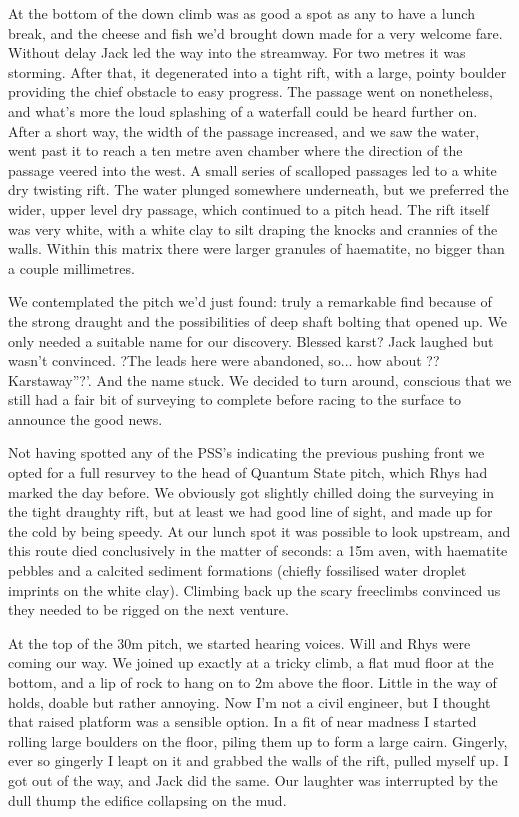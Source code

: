 \documentclass[onecolumn]{book}
\begin{document}
At the bottom of the down climb was as good a spot as any to have a lunch break, and the cheese and fish we'd brought down made for a very welcome fare. Without delay Jack led the way into the streamway. For two metres it was storming. After that, it degenerated into a tight rift, with a large, pointy boulder providing the chief obstacle to easy progress. The passage went on nonetheless, and what's more the loud splashing of a waterfall could be heard further on. After a short way, the width of the passage increased, and we saw the water, went past it to reach a ten metre aven chamber where the direction of the passage veered into the west. A small series of scalloped passages led to a white dry twisting rift. The water plunged somewhere underneath, but we preferred the wider, upper level dry passage, which continued to a pitch head. The rift itself was very white, with a white clay to silt draping the knocks and crannies of the walls. Within this matrix there were larger granules of haematite, no bigger than a couple millimetres. 

We contemplated the pitch we'd just found: truly a remarkable find because of the strong draught and the possibilities of deep shaft bolting that opened up. We only needed a suitable name for our discovery. Blessed karst? Jack laughed but wasn't convinced. ?The leads here were abandoned, so... how about ??Karstaway''?'. And the name stuck. We decided to turn around, conscious that we still had a fair bit of surveying to complete before racing to the surface to announce the good news. 

Not having spotted any of the PSS's indicating the previous pushing front we opted for a full resurvey to the head of Quantum State pitch, which Rhys had marked the day before. We obviously got slightly chilled doing the surveying in the tight draughty rift, but at least we had good line of sight, and made up for the cold by being speedy. At our lunch spot it was possible to look upstream, and this route died conclusively in the matter of seconds: a 15m aven, with haematite pebbles and a calcited sediment formations (chiefly fossilised water droplet imprints on the white clay). Climbing back up the scary freeclimbs convinced us they needed to be rigged on the next venture. 

At the top of the 30m pitch, we started hearing voices. Will and Rhys were coming our way. We joined up exactly at a tricky climb, a flat mud floor at the bottom, and a lip of rock to hang on to 2m above the floor. Little in the way of holds, doable but rather annoying. Now I'm not a civil engineer, but I thought that raised platform was a sensible option. In a fit of near madness I started rolling large boulders on the floor, piling them up to form a large cairn. Gingerly, ever so gingerly I leapt on it and grabbed the walls of the rift, pulled myself up. I got out of the way, and Jack did the same. Our laughter was interrupted by the dull thump the edifice collapsing on the mud. 
\end{document}
